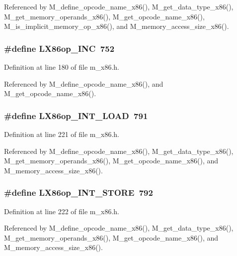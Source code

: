 Referenced by M\_\-define\_\-opcode\_\-name\_\-x86(), M\_\-get\_\-data\_\-type\_\-x86(), M\_\-get\_\-memory\_\-operands\_\-x86(), M\_\-get\_\-opcode\_\-name\_\-x86(), M\_\-is\_\-implicit\_\-memory\_\-op\_\-x86(), and M\_\-memory\_\-access\_\-size\_\-x86().
\subsubsection{\setlength{\rightskip}{0pt plus 5cm}\#define LX86op\_\-INC~752}\label{m__x86_8h_e370360b2d757ad5311d468db007833e}




Definition at line 180 of file m\_\-x86.h.

Referenced by M\_\-define\_\-opcode\_\-name\_\-x86(), and M\_\-get\_\-opcode\_\-name\_\-x86().
\subsubsection{\setlength{\rightskip}{0pt plus 5cm}\#define LX86op\_\-INT\_\-LOAD~791}\label{m__x86_8h_86e42bd1f6f83377ac3880947a9f2503}




Definition at line 221 of file m\_\-x86.h.

Referenced by M\_\-define\_\-opcode\_\-name\_\-x86(), M\_\-get\_\-data\_\-type\_\-x86(), M\_\-get\_\-memory\_\-operands\_\-x86(), M\_\-get\_\-opcode\_\-name\_\-x86(), and M\_\-memory\_\-access\_\-size\_\-x86().
\subsubsection{\setlength{\rightskip}{0pt plus 5cm}\#define LX86op\_\-INT\_\-STORE~792}\label{m__x86_8h_1f5f60b763b6f8a8643b270254a3e32b}




Definition at line 222 of file m\_\-x86.h.

Referenced by M\_\-define\_\-opcode\_\-name\_\-x86(), M\_\-get\_\-data\_\-type\_\-x86(), M\_\-get\_\-memory\_\-operands\_\-x86(), M\_\-get\_\-opcode\_\-name\_\-x86(), and M\_\-memory\_\-access\_\-size\_\-x86().
